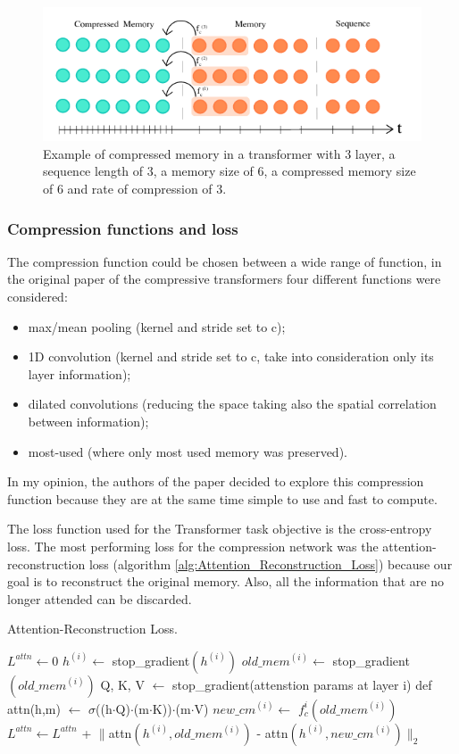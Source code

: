 \begin{figure}[H]
	\begin{center}
		\includegraphics[width=0.7\linewidth]{img/compressed_memory.png}
	\end{center}
	\caption{Example of compressed memory in a transformer with 3 layer, a sequence length of 3, a memory size of 6, a compressed memory size of 6 and rate of compression of 3.}
	\label{fig:comprssed_memory}
\end{figure}


\subsubsection{Compression functions and loss}
The compression function could be chosen between a wide range of function, in the original paper of the compressive transformers \cite{raecompressive2019} four different functions were considered:
\begin{itemize}
	\item max/mean pooling (kernel and stride set to c);
	\item 1D convolution (kernel and stride set to c, take into consideration only its layer information);
	\item dilated convolutions (reducing the space taking also the spatial correlation between information);
	\item most-used (where only most used memory was preserved).
\end{itemize}
In my opinion, the authors of the paper \cite{raecompressive2019} decided to explore this compression function because they are at the same time simple to use and fast to compute.

The loss function used for the Transformer task objective is the cross-entropy loss.
The most performing loss for the compression network was the attention-reconstruction loss (algorithm \ref{alg:Attention_Reconstruction_Loss}) because our goal is to reconstruct the original memory. Also, all the information that are no longer attended can be discarded.

\begin{algorithm}[H]
	\caption{Attention-Reconstruction Loss.}
	\label{alg:Attention_Reconstruction_Loss}
	\begin{algorithmic}[1]
		\State $L^{attn} \gets 0$
		\State $h^{(i)} \gets$ stop\_gradient$(h^{(i)})$
		\State $old\_mem^{(i)} \gets$ stop\_gradient$(old\_mem^{(i)})$
		\State Q, K, V $\gets$ stop\_gradient(attenstion params at layer i)
		\State def attn(h,m) $\gets$ $\sigma$((h$\cdot$Q)$\cdot$(m$\cdot$K))$\cdot$(m$\cdot$V)
		\State $new\_cm^{(i)} \gets$ $f_{c}^{i}(old\_mem^{(i)})$
		\State $L^{attn} \gets L^{attn}$ + $\parallel$attn$(h^{(i)},old\_mem^{(i)})$ - attn$(h^{(i)},new\_cm^{(i)})$$\parallel_{2}$
		\EndFor
	\end{algorithmic}
\end{algorithm}
